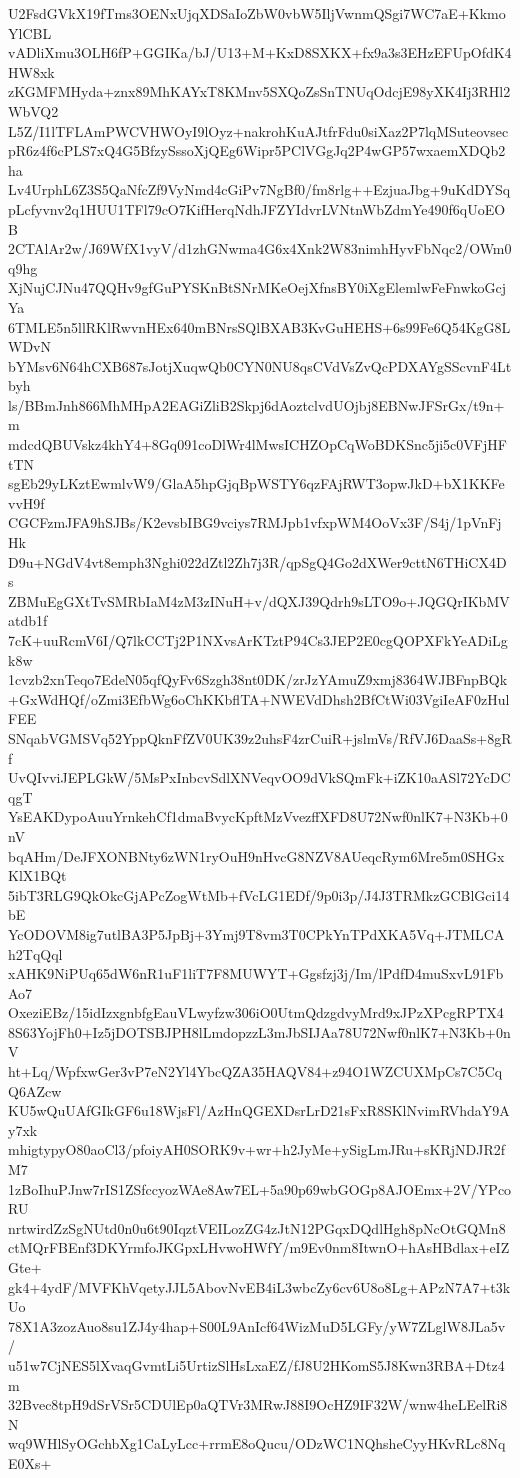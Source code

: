 U2FsdGVkX19fTms3OENxUjqXDSaIoZbW0vbW5IljVwnmQSgi7WC7aE+KkmoYlCBL
vADliXmu3OLH6fP+GGIKa/bJ/U13+M+KxD8SXKX+fx9a3s3EHzEFUpOfdK4HW8xk
zKGMFMHyda+znx89MhKAYxT8KMnv5SXQoZsSnTNUqOdcjE98yXK4Ij3RHl2WbVQ2
L5Z/I1lTFLAmPWCVHWOyI9lOyz+nakrohKuAJtfrFdu0siXaz2P7lqMSuteovsec
pR6z4f6cPLS7xQ4G5BfzySssoXjQEg6Wipr5PClVGgJq2P4wGP57wxaemXDQb2ha
Lv4UrphL6Z3S5QaNfcZf9VyNmd4cGiPv7NgBf0/fm8rlg++EzjuaJbg+9uKdDYSq
pLcfyvnv2q1HUU1TFl79cO7KifHerqNdhJFZYIdvrLVNtnWbZdmYe490f6qUoEOB
2CTAlAr2w/J69WfX1vyV/d1zhGNwma4G6x4Xnk2W83nimhHyvFbNqc2/OWm0q9hg
XjNujCJNu47QQHv9gfGuPYSKnBtSNrMKeOejXfnsBY0iXgElemlwFeFnwkoGcjYa
6TMLE5n5llRKlRwvnHEx640mBNrsSQlBXAB3KvGuHEHS+6s99Fe6Q54KgG8LWDvN
bYMsv6N64hCXB687sJotjXuqwQb0CYN0NU8qsCVdVsZvQcPDXAYgSScvnF4Ltbyh
ls/BBmJnh866MhMHpA2EAGiZliB2Skpj6dAoztclvdUOjbj8EBNwJFSrGx/t9n+m
mdcdQBUVskz4khY4+8Gq091coDlWr4lMwsICHZOpCqWoBDKSnc5ji5c0VFjHFtTN
sgEb29yLKztEwmlvW9/GlaA5hpGjqBpWSTY6qzFAjRWT3opwJkD+bX1KKFevvH9f
CGCFzmJFA9hSJBs/K2evsbIBG9vciys7RMJpb1vfxpWM4OoVx3F/S4j/1pVnFjHk
D9u+NGdV4vt8emph3Nghi022dZtl2Zh7j3R/qpSgQ4Go2dXWer9cttN6THiCX4Ds
ZBMuEgGXtTvSMRbIaM4zM3zINuH+v/dQXJ39Qdrh9sLTO9o+JQGQrIKbMVatdb1f
7cK+uuRcmV6I/Q7lkCCTj2P1NXvsArKTztP94Cs3JEP2E0cgQOPXFkYeADiLgk8w
1cvzb2xnTeqo7EdeN05qfQyFv6Szgh38nt0DK/zrJzYAmuZ9xmj8364WJBFnpBQk
+GxWdHQf/oZmi3EfbWg6oChKKbflTA+NWEVdDhsh2BfCtWi03VgiIeAF0zHulFEE
SNqabVGMSVq52YppQknFfZV0UK39z2uhsF4zrCuiR+jslmVs/RfVJ6DaaSs+8gRf
UvQIvviJEPLGkW/5MsPxInbcvSdlXNVeqvOO9dVkSQmFk+iZK10aASl72YcDCqgT
YsEAKDypoAuuYrnkehCf1dmaBvycKpftMzVvezffXFD8U72Nwf0nlK7+N3Kb+0nV
bqAHm/DeJFXONBNty6zWN1ryOuH9nHvcG8NZV8AUeqcRym6Mre5m0SHGxKlX1BQt
5ibT3RLG9QkOkcGjAPcZogWtMb+fVcLG1EDf/9p0i3p/J4J3TRMkzGCBlGci14bE
YcODOVM8ig7utlBA3P5JpBj+3Ymj9T8vm3T0CPkYnTPdXKA5Vq+JTMLCAh2TqQql
xAHK9NiPUq65dW6nR1uF1liT7F8MUWYT+Ggsfzj3j/Im/lPdfD4muSxvL91FbAo7
OxeziEBz/15idIzxgnbfgEauVLwyfzw306iO0UtmQdzgdvyMrd9xJPzXPcgRPTX4
8S63YojFh0+Iz5jDOTSBJPH8lLmdopzzL3mJbSIJAa78U72Nwf0nlK7+N3Kb+0nV
ht+Lq/WpfxwGer3vP7eN2Yl4YbcQZA35HAQV84+z94O1WZCUXMpCs7C5CqQ6AZcw
KU5wQuUAfGIkGF6u18WjsFl/AzHnQGEXDsrLrD21sFxR8SKlNvimRVhdaY9Ay7xk
mhigtypyO80aoCl3/pfoiyAH0SORK9v+wr+h2JyMe+ySigLmJRu+sKRjNDJR2fM7
1zBoIhuPJnw7rIS1ZSfccyozWAe8Aw7EL+5a90p69wbGOGp8AJOEmx+2V/YPcoRU
nrtwirdZzSgNUtd0n0u6t90IqztVEILozZG4zJtN12PGqxDQdlHgh8pNcOtGQMn8
ctMQrFBEnf3DKYrmfoJKGpxLHvwoHWfY/m9Ev0nm8ItwnO+hAsHBdlax+eIZGte+
gk4+4ydF/MVFKhVqetyJJL5AbovNvEB4iL3wbcZy6cv6U8o8Lg+APzN7A7+t3kUo
78X1A3zozAuo8su1ZJ4y4hap+S00L9AnIcf64WizMuD5LGFy/yW7ZLglW8JLa5v/
u51w7CjNES5lXvaqGvmtLi5UrtizSlHsLxaEZ/fJ8U2HKomS5J8Kwn3RBA+Dtz4m
32Bvec8tpH9dSrVSr5CDUlEp0aQTVr3MRwJ88I9OcHZ9IF32W/wnw4heLEelRi8N
wq9WHlSyOGchbXg1CaLyLcc+rrmE8oQucu/ODzWC1NQhsheCyyHKvRLc8NqE0Xs+
